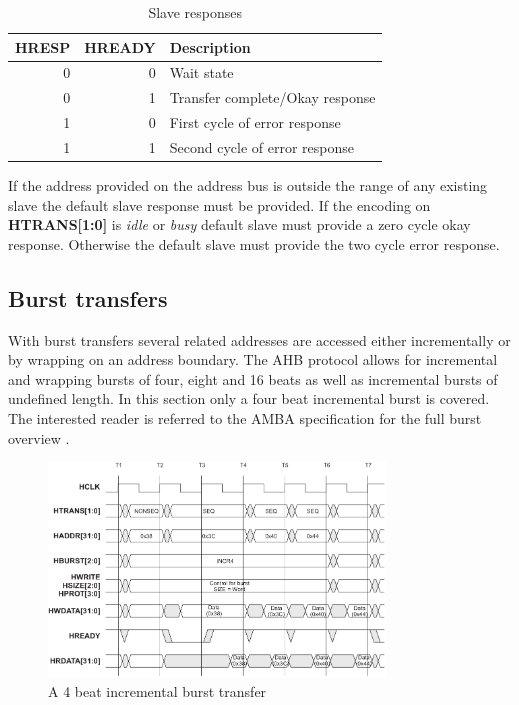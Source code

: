 \begin{table}[hbt]
  \label{tab:hsize}
  \begin{tabular}{|r|r|p{10cm}|} 
  \hline
  \textbf{HRESP} & \textbf{HREADY} & \textbf{Description} \\
    \hline
  0 & 0 & Wait state\\
    \hline
  0 & 1 & Transfer complete/Okay response \\
    \hline
  1 & 0 & First cycle of error response\\
    \hline
  1 & 1 & Second cycle of error response \\
\hline
  \end{tabular}
\caption{Slave responses}
\end{table}

If the address provided on the address bus is outside the range of any existing slave the default slave response must be provided. If the encoding on \textbf{HTRANS[1:0]} is \textit{idle} or \textit{busy} default slave must provide a zero cycle okay response. Otherwise the default slave must provide the two cycle error response. 

\subsection{Burst transfers}
With burst transfers several related addresses are accessed either incrementally or by wrapping on an address boundary. The AHB protocol allows for incremental
 and wrapping bursts of four, eight and 16 beats as well as incremental bursts of undefined length. In this section only a four beat incremental burst is covered. The interested reader is referred to the AMBA specification for the full burst overview \cite{amba}.

\begin{figure}[hbt]
    \begin{center}
        \includegraphics[width=0.8\textwidth]{figs/AHB/burst.png}
    \end{center}
    \caption{A 4 beat incremental burst transfer}
    \label{fig:burst}
\end{figure}

